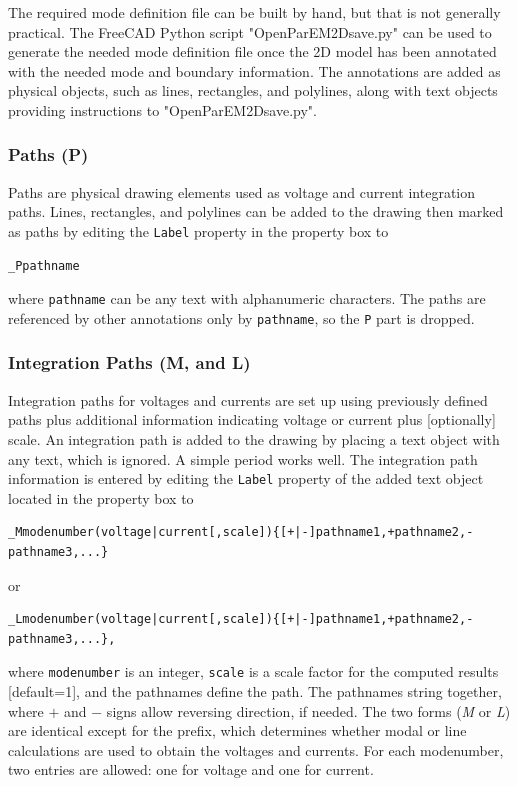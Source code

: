 \documentclass[titlepage]{article}
\renewcommand\_{\textunderscore\linebreak[1]}
\begin{document}
The required mode definition file can be built by hand, but that is not generally practical.  The FreeCAD Python script "OpenParEM2D\_save.py" can be used to generate the needed mode definition file once the 2D model has been annotated with the needed mode and boundary information.  The annotations are added as physical objects, such as lines, rectangles, and polylines, along with text objects providing instructions to "OpenParEM2D\_save.py". 

\subsubsection{Paths (\_P)}
\label{sec:paths}

Paths are physical drawing elements used as voltage and current integration paths.  Lines, rectangles, and polylines can be added to the drawing then marked as paths by editing the \texttt{Label} property in the property box to
\begin{Verbatim}[fontsize=\small]
  _Ppathname
\end{Verbatim}
\noindent where \texttt{pathname} can be any text with alphanumeric characters.  The paths are referenced by other annotations only by \texttt{pathname}, so the \texttt{\_P} part is dropped.

\subsubsection{Integration Paths (\_M, and \_L)}
\label{sec:integration_paths}

Integration paths for voltages and currents are set up using previously defined paths plus additional information indicating voltage or current plus [optionally] scale. An integration path is added to the drawing by placing a text object with any text, which is ignored.  A simple period works well.  The integration path information is entered by editing the \texttt{Label} property of the added text object located in the property box to
\begin{Verbatim}[fontsize=\small]
  _Mmodenumber(voltage|current[,scale]){[+|-]pathname1,+pathname2,-pathname3,...}
\end{Verbatim}
\noindent or
\begin{Verbatim}[fontsize=\small]
  _Lmodenumber(voltage|current[,scale]){[+|-]pathname1,+pathname2,-pathname3,...},
\end{Verbatim}
\noindent where \texttt{modenumber} is an integer, \texttt{scale} is a scale factor for the computed results [default=1], and the pathnames define the path.  The pathnames string together, where $+$ and $-$ signs allow reversing direction, if needed.  The two forms (\textit{\_M} or \textit{\_L}) are identical except for the prefix, which determines whether modal or line calculations are used to obtain the voltages and currents.  For each modenumber, two entries are allowed: one for voltage and one for current.
\end{document}

